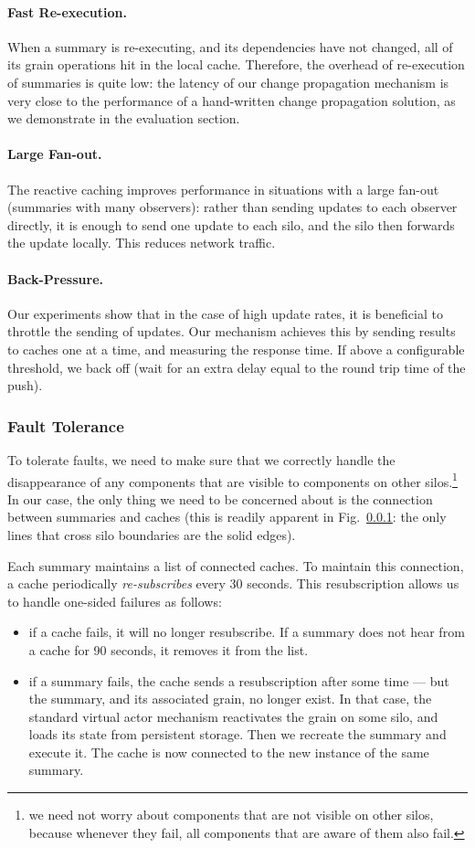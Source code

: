 \paragraph{Fast Re-execution.} When a summary is re-executing, and its dependencies have not changed, all of its grain operations hit in the local cache. Therefore, the overhead of re-execution of summaries is quite low: the latency of our change propagation mechanism is very close to the performance of a hand-written change propagation solution, as we demonstrate in the evaluation section.

\paragraph{Large Fan-out.} The reactive caching improves performance in situations with a large fan-out (summaries with many observers): rather than sending updates to each observer directly, it is enough to send one update to each silo, and the silo then forwards the update locally. This reduces network traffic.

\paragraph{Back-Pressure.} 
Our experiments show that in the case of high update rates, it is beneficial to throttle the sending of updates. Our mechanism achieves this by sending results to caches one at a time, and measuring the response time. If above a configurable threshold, we back off (wait for an extra delay equal to the round trip time of the push). 

\subsubsection{Fault Tolerance}

To tolerate faults, we need to make sure that we correctly handle the disappearance of any components that are visible to components on other silos.\footnote{we need not worry about components that are not visible on other silos, because whenever they fail, all components that are aware of them also fail.} In our case, the only thing we need to be concerned about is the connection between summaries and caches (this is readily apparent in Fig.~\ref{}: the only lines that cross silo boundaries are the solid edges).

Each summary maintains a list of connected caches. To maintain this connection, a cache periodically \emph{re-subscribes} every 30 seconds. This resubscription allows us to handle one-sided failures as follows:
\begin{itemize}
\item if a cache fails, it will no longer resubscribe. If a summary does not hear from a cache for 90 seconds, it removes it from the list. 
\item if a summary fails, the cache sends a resubscription after some time --- but the summary, and its associated grain, no longer exist. In that case, the standard virtual actor mechanism reactivates the grain on some silo, and loads its state from persistent storage. Then we recreate the summary and execute it. The cache is now connected to the new instance of the same summary. 
\end{itemize}
